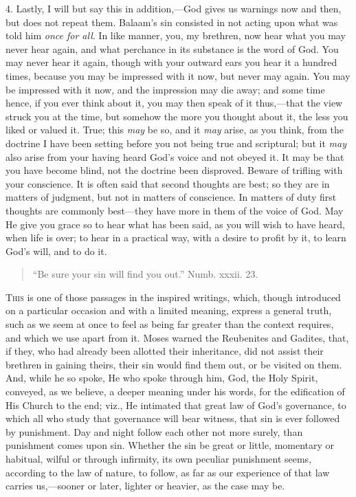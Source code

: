 4. Lastly, I will but say this in addition,—God gives us warnings
now and then, but does not repeat them. Balaam's sin consisted in not
acting upon what was told him \emph{once for all}. In like manner,
you, my brethren, now hear what you may never hear again, and what
perchance in its substance is the word of God. You may never hear it
again, though with your outward ears you hear it a hundred times,
because you may be impressed with it now, but never may again. You may
be impressed with it now, and the impression may die away; and some
time hence, if you ever think about it, you may then speak of it thus,—that
the view struck you at the time, but somehow the more you thought
about it, the less you liked or valued it. True; this \emph{may} be
so, and it \emph{may} arise, as you think, from the doctrine I have
been setting before you not being true and scriptural; but it \emph{may}
also arise from your having heard God's voice and not obeyed it. It
may be that you have become blind, not the doctrine been disproved.
Beware of trifling with your conscience. It is often said that second
thoughts are best; so they are in matters of judgment, but not in
matters of conscience. In matters of duty first thoughts are commonly
best—they have more in them of the voice of God. May He give you
grace so to hear what has been said, as you will wish to have heard,
when life is over; to hear in a practical way, with a desire to profit
by it, to learn God's will, and to do it.


\begin{quote}

``Be sure your sin will find you out.'' Numb. xxxii. 23.

\end{quote}

T\textsc{his} is one of those passages in the inspired writings, which,
though introduced on a particular occasion and with a limited meaning,
express a general truth, such as we seem at once to feel as being far
greater than the context requires, and which we use apart from it.
Moses warned the Reubenites and Gadites, that, if they, who had
already been allotted their inheritance, did not assist their brethren
in gaining theirs, their sin would find them out, or be visited on
them. And, while he so spoke, He who spoke through him, God, the Holy
Spirit, conveyed, as we believe, a deeper meaning under his words, for
the edification of His Church to the end; viz., He intimated that
great law of God's governance, to which all who study that governance
will bear witness, that sin is ever followed by punishment. Day and
night follow each other not more surely, than punishment comes upon
sin. Whether the sin be great or little, momentary or habitual, wilful
or through infirmity, its own peculiar punishment seems, according to
the law of nature, to follow, as far as our experience of that law
carries us,—sooner or later, lighter or heavier, as the case may be.

